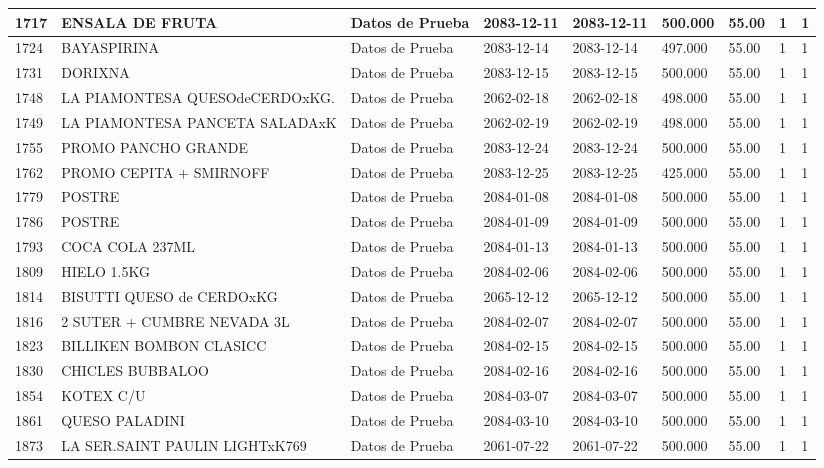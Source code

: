 \documentclass[a4paper,12pt]{article}
\begin{document}
\begin{landscape}
\begin{longtable}{|p{4cm}|p{2.5cm}|p{2.5cm}|p{1.8cm}|p{1.8cm}|p{1cm}|p{1cm}|p{3cm}|p{3cm}||}
1717 & ENSALA DE FRUTA & Datos de Prueba & 2083-12-11 & 2083-12-11 & 500.000 & 55.00 & 1 & 1 \\ \hline 
1724 & BAYASPIRINA & Datos de Prueba & 2083-12-14 & 2083-12-14 & 497.000 & 55.00 & 1 & 1 \\ \hline 
1731 & DORIXNA & Datos de Prueba & 2083-12-15 & 2083-12-15 & 500.000 & 55.00 & 1 & 1 \\ \hline 
1748 & LA PIAMONTESA QUESOdeCERDOxKG. & Datos de Prueba & 2062-02-18 & 2062-02-18 & 498.000 & 55.00 & 1 & 1 \\ \hline 
1749 & LA PIAMONTESA PANCETA SALADAxK & Datos de Prueba & 2062-02-19 & 2062-02-19 & 498.000 & 55.00 & 1 & 1 \\ \hline 
1755 & PROMO PANCHO GRANDE & Datos de Prueba & 2083-12-24 & 2083-12-24 & 500.000 & 55.00 & 1 & 1 \\ \hline 
1762 & PROMO CEPITA + SMIRNOFF & Datos de Prueba & 2083-12-25 & 2083-12-25 & 425.000 & 55.00 & 1 & 1 \\ \hline 
1779 & POSTRE & Datos de Prueba & 2084-01-08 & 2084-01-08 & 500.000 & 55.00 & 1 & 1 \\ \hline 
1786 & POSTRE & Datos de Prueba & 2084-01-09 & 2084-01-09 & 500.000 & 55.00 & 1 & 1 \\ \hline 
1793 & COCA COLA 237ML & Datos de Prueba & 2084-01-13 & 2084-01-13 & 500.000 & 55.00 & 1 & 1 \\ \hline 
1809 & HIELO 1.5KG & Datos de Prueba & 2084-02-06 & 2084-02-06 & 500.000 & 55.00 & 1 & 1 \\ \hline 
1814 & BISUTTI QUESO de CERDOxKG & Datos de Prueba & 2065-12-12 & 2065-12-12 & 500.000 & 55.00 & 1 & 1 \\ \hline 
1816 & 2 SUTER + CUMBRE NEVADA 3L & Datos de Prueba & 2084-02-07 & 2084-02-07 & 500.000 & 55.00 & 1 & 1 \\ \hline 
1823 & BILLIKEN BOMBON CLASICC & Datos de Prueba & 2084-02-15 & 2084-02-15 & 500.000 & 55.00 & 1 & 1 \\ \hline 
1830 & CHICLES BUBBALOO & Datos de Prueba & 2084-02-16 & 2084-02-16 & 500.000 & 55.00 & 1 & 1 \\ \hline 
1854 & KOTEX C/U & Datos de Prueba & 2084-03-07 & 2084-03-07 & 500.000 & 55.00 & 1 & 1 \\ \hline 
1861 & QUESO PALADINI & Datos de Prueba & 2084-03-10 & 2084-03-10 & 500.000 & 55.00 & 1 & 1 \\ \hline 
1873 & LA SER.SAINT PAULIN LIGHTxK769 & Datos de Prueba & 2061-07-22 & 2061-07-22 & 500.000 & 55.00 & 1 & 1 \\ \hline 

\end{longtable}
\end{landscape}
\end{document}
